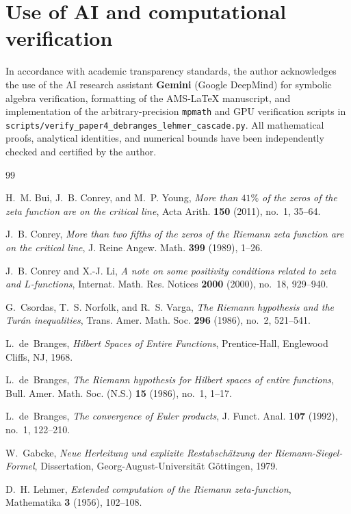 \documentclass[11pt,reqno,a4paper]{amsart}
\theoremstyle{plain}
\theoremstyle{definition}
\theoremstyle{remark}
\numberwithin{equation}{section}
\begin{document}
\section*{Use of AI and computational verification}
In accordance with academic transparency standards, the author acknowledges the use of the AI research assistant \textbf{Gemini} (Google DeepMind) for symbolic algebra verification, formatting of the AMS-\LaTeX{} manuscript, and implementation of the arbitrary-precision \texttt{mpmath} and GPU verification scripts in \texttt{scripts/verify\_paper4\_debranges\_lehmer\_cascade.py}. All mathematical proofs, analytical identities, and numerical bounds have been independently checked and certified by the author.

\begin{thebibliography}{99}

H.~M. Bui, J.~B. Conrey, and M.~P. Young,
\emph{More than $41\%$ of the zeros of the zeta function are on the critical line},
Acta Arith. \textbf{150} (2011), no.~1, 35--64.

J.~B. Conrey,
\emph{More than two fifths of the zeros of the Riemann zeta function are on the critical line},
J. Reine Angew. Math. \textbf{399} (1989), 1--26.

J.~B. Conrey and X.-J. Li,
\emph{A note on some positivity conditions related to zeta and $L$-functions},
Internat. Math. Res. Notices \textbf{2000} (2000), no.~18, 929--940.

G.~Csordas, T.~S. Norfolk, and R.~S. Varga,
\emph{The Riemann hypothesis and the Tur\'an inequalities},
Trans. Amer. Math. Soc. \textbf{296} (1986), no.~2, 521--541.

L.~de~Branges,
\emph{Hilbert Spaces of Entire Functions},
Prentice-Hall, Englewood Cliffs, NJ, 1968.

L.~de~Branges,
\emph{The Riemann hypothesis for Hilbert spaces of entire functions},
Bull. Amer. Math. Soc. (N.S.) \textbf{15} (1986), no.~1, 1--17.

L.~de~Branges,
\emph{The convergence of Euler products},
J. Funct. Anal. \textbf{107} (1992), no.~1, 122--210.

W.~Gabcke,
\emph{Neue Herleitung und explizite Restabsch\"atzung der Riemann-Siegel-Formel},
Dissertation, Georg-August-Universit\"at G\"ottingen, 1979.

D.~H. Lehmer,
\emph{Extended computation of the Riemann zeta-function},
Mathematika \textbf{3} (1956), 102--108.


\end{thebibliography}
\end{document}
